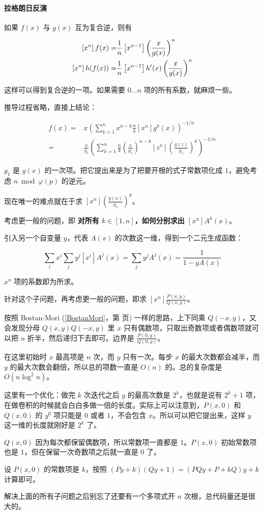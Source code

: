 \paragraph{拉格朗日反演} 如果 $f(x)$ 与 $g(x)$ 互为复合逆，则有

$$ \begin{aligned}\relax \left[x^n\right]f(x)=&\frac{1}{n}\left[x^{n-1}\right]\left(\frac{x}{g(x)}\right)^n \\
\relax \left[x^n\right]h(f(x))=&\frac{1}{n}\left[x^{n-1}\right]h'(x)\left(\frac{x}{g(x)}\right)^n\end{aligned} $$

这样可以得到复合逆的一项。如果需要 $0 \dots n$ 项的所有系数，就麻烦一些。

推导过程省略，直接上结论：

$$ \begin{aligned}
f(x) =& x \left( \sum_{k = 1} ^ n x^{n - k} \frac n k \left[ x^n \right] g^k(x) \right) ^ {- 1 / n} \\
=& \frac x {g_1} \left( \sum_{k = 1} ^ n \frac n k \left( \frac x {g_1} \right) ^ {n - k} \left[ z^n \right] \left( \frac {g(z)} {g_1} \right) ^k \right) ^ {- 1 / n}
\end{aligned} $$

$g_1$ 是 $g(x)$ 的一次项。把它提出来是为了把要开根的式子常数项化成 $1$，避免考虑 $n \bmod \varphi(p)$ 的逆元。

现在唯一的难点就在于求 $[x^n] \left( \frac {g(x)} {g_1} \right) ^ k$。

考虑更一般的问题，即 \textbf{对所有 $k \in [1, n]$，如何分别求出 $[x^n] A^k(x)$}。

引入另一个自变量 $y$，代表 $A(x)$ 的次数这一维，得到一个二元生成函数：

$$ \sum_{i} x^i \sum_{j} y^j [x^i] A^j(x) = \sum_{j} y^j A^j(x) = \frac 1 {1 - y A(x)} $$

$x^n$ 项的系数即为所求。

针对这个子问题，再考虑更一般的问题，即求 $[x^n] \frac {P(x, y)} {Q(x, y)}$。

按照 Bostan-Mori (\ref{BostanMori}，第 \pageref{BostanMori} 页) 一样的思路，上下同乘 $Q(-x, y)$，又会发现分母 $Q(x, y) Q(-x, y)$ 里 $x$ 只有偶数项，只取出奇数项或者偶数项就可以把 $n$ 折半，然后递归下去即可。边界是 $\frac {P(0, y)} {Q(0, y)}$。

在这里初始时 $x$ 最高项是 $n$ 次，而 $y$ 只有一次。每步 $x$ 的最大次数都会减半，而 $y$ 的最大次数会翻倍，所以总的项数一直是 $O(n)$ 的。总的复杂度是 $O(n \log^2 n)$。

这里有一个优化：做完 $k$ 次迭代之后 $y$ 的最高次数是 $2^k$，也就是说有 $2^k + 1$ 项，在做卷积的时候就会白白多做一倍的长度。实际上可以注意到，$P(x, 0)$ 和 $Q(x, 0)$ 的 $y^0$ 项只能是 $0$ 或者 $1$，不会包含 $x$。所以可以把它提出来，这样 $y$ 这一维的长度就刚好是 $2^k$ 了。

$Q(x, 0)$ 因为每次都保留偶数项，所以常数项一直都是 $1$。$P(x, 0)$ 初始常数项也是 $1$，但在保留一次奇数项之后就一直是 $0$ 了。

设 $P(x, 0)$ 的常数项是 $k$，按照 $(Py + k) (Qy + 1) = (PQy + P + kQ)y + k$ 计算即可。

解决上面的所有子问题之后别忘了还要有一个多项式开 $n$ 次根，总代码量还是很大的。

\inputminted{cpp}{../src/math/多项式复合逆.cpp}
